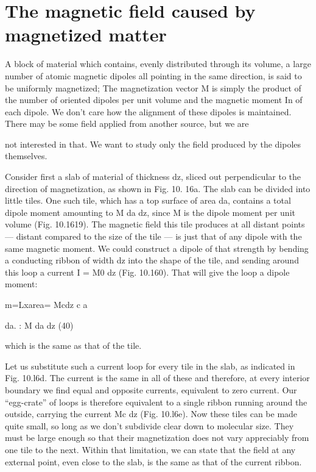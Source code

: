 \section{The magnetic field caused by magnetized matter}

A block of material which contains, evenly distributed through its
volume, a large number of atomic magnetic dipoles all pointing in
the same direction, is said to be uniformly magnetized; The magnetization
vector M is simply the product of the number of oriented
dipoles per unit volume and the magnetic moment In of each dipole.
We don't care how the alignment of these dipoles is maintained.
There may be some field applied from another source, but we are

not interested in that. We want to study only the field produced
by the dipoles themselves.

Consider first a slab of material of thickness dz, sliced out perpendicular
to the direction of magnetization, as shown in Fig. 10. 16a.
The slab can be divided into little tiles. One such tile, which has a
top surface of area da, contains a total dipole moment amounting to
M da dz, since M is the dipole moment per unit volume (Fig. 10.1619).
The magnetic field this tile produces at all distant points --- distant
compared to the size of the tile --- is just that of any dipole with the
same magnetic moment. We could construct a dipole of that
strength by bending a conducting ribbon of width dz into the shape
of the tile, and sending around this loop a current I = M0 dz (Fig.
10.160). That will give the loop a dipole moment:
\begin{equation}
\end{equation}

m=Lxarea= Mcdz
c a

da. : M da dz (40)

which is the same as that of the tile.

Let us substitute such a current loop for every tile in the slab, as
indicated in Fig. 10.l6d. The current is the same in all of these and
therefore, at every interior boundary we find equal and opposite
currents, equivalent to zero current. Our ``egg-crate'' of loops is
therefore equivalent to a single ribbon running around the outside,
carrying the current Mc dz (Fig. 10.l6e). Now these tiles can be
made quite small, so long as we don't subdivide clear down to molecular
size. They must be large enough so that their magnetization
does not vary appreciably from one tile to the next. Within that
limitation, we can state that the field at any external point, even close
to the slab, is the same as that of the current ribbon.

